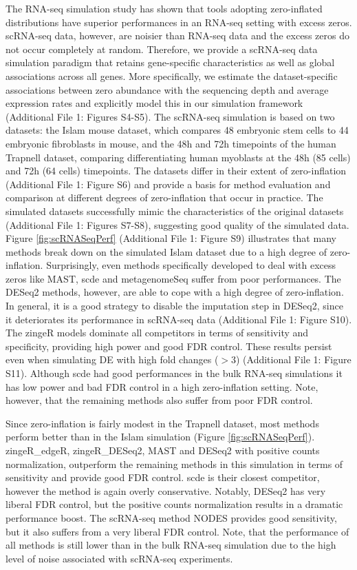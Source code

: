 \documentclass{bmcart}
\begin{document}
The RNA-seq simulation study has shown that tools adopting zero-inflated distributions have superior performances in an RNA-seq setting with excess zeros.
scRNA-seq data, however, are noisier than RNA-seq data and the excess zeros do not occur completely at random. 
Therefore, we provide a scRNA-seq data simulation paradigm that retains gene-specific characteristics as well as global associations across all genes.
More specifically, we estimate the dataset-specific associations between zero abundance with the sequencing depth and average expression rates and explicitly model this in our simulation framework (Additional File 1: Figures S4-S5).
The scRNA-seq simulation is based on two datasets: the Islam \cite{Islam2011} mouse dataset, which compares 48 embryonic stem cells to 44 embryonic fibroblasts in mouse, and the 48h and 72h timepoints of the human Trapnell \cite{Trapnell2013} dataset, comparing differentiating human myoblasts at the 48h (85 cells) and 72h (64 cells) timepoints.
The datasets differ in their extent of zero-inflation (Additional File 1: Figure S6) and provide a basis for method evaluation and comparison at different degrees of zero-inflation that occur in practice. 
The simulated datasets successfully mimic the characteristics of the original datasets (Additional File 1: Figures S7-S8), suggesting good quality of the simulated data.
Figure \ref{fig:scRNASeqPerf} (Additional File 1: Figure S9)  illustrates that many methods break down on the simulated Islam dataset due to a high degree of zero-inflation.
Surprisingly, even methods specifically developed to deal with excess zeros like MAST, scde and metagenomeSeq suffer from poor performances.
The DESeq2 methods, however, are able to cope with a high degree of zero-inflation.
In general, it is a good strategy to disable the imputation step in DESeq2, since it deteriorates its performance in scRNA-seq data (Additional File 1: Figure S10).
The zingeR models dominate all competitors in terms of sensitivity and specificity, providing high power and good FDR control.
These results persist even when simulating DE with high fold changes ($>3$)  (Additional File 1: Figure S11).
Although scde had good performances in the bulk RNA-seq simulations it has low power and bad FDR control in a high zero-inflation setting.
Note, however, that the remaining methods also suffer from poor FDR control.

Since zero-inflation is fairly modest in the Trapnell dataset, most methods perform better than in the Islam simulation (Figure \ref{fig:scRNASeqPerf}).
zingeR\_edgeR, zingeR\_DESeq2, MAST and DESeq2 with positive counts normalization, outperform the remaining methods in this simulation in terms of sensitivity and provide good FDR control.
scde is their closest competitor, however the method is again overly conservative.
Notably, DESeq2 has very liberal FDR control, but the positive counts normalization results in a dramatic performance boost.
The scRNA-seq method NODES provides good sensitivity, but it also suffers from a very liberal FDR control.
Note, that the performance of all methods is still lower than in the bulk RNA-seq simulation due to the high level of noise associated with scRNA-seq experiments.
\end{document}
